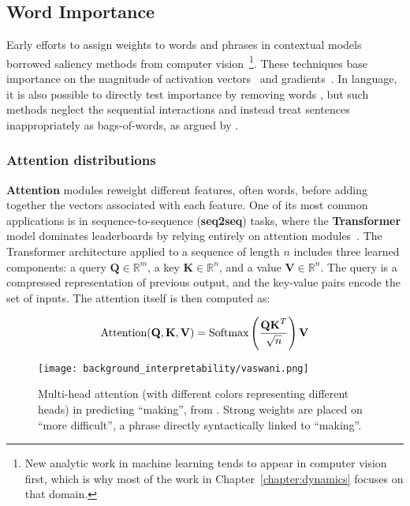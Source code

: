 \subsection{Word Importance} \label{sec:importance}

Early efforts to assign weights to words and phrases in contextual models borrowed saliency methods from computer vision~\citep{Simonyan2014DeepIC}\footnote{New analytic work in machine learning tends to appear in computer vision first, which is why most of the work in Chapter~\ref{chapter:dynamics} focuses on that domain.}. These  techniques base importance on the magnitude of activation vectors~\citep{karpathy_visualizing_2015} and gradients~\citep{li_visualizing_2015}. In language, it is also possible to directly test importance by removing words \citep{arras-etal-2016-explaining,li_understanding_2016}, but such methods neglect the sequential interactions and instead treat sentences inappropriately as bags-of-words, as argued by \citet{feng_pathologies_2018}.

\subsubsection{Attention distributions} \label{sec:attention_importance}

\textbf{Attention} modules reweight different features, often words, before adding together the vectors associated with each feature. One of its most common applications is in sequence-to-sequence (\textbf{seq2seq}) tasks, where the \textbf{Transformer} model dominates leaderboards by relying entirely on attention modules~\citep{vaswani_attention_2017}. The Transformer architecture applied to a sequence of length $n$ includes three learned components: a query $\textbf{Q} \in \mathbb{R}^m$, a key $\textbf{K} \in \mathbb{R}^n$, and a value $\textbf{V} \in \mathbb{R}^n$. The query is a compressed representation of previous output, and the key-value pairs encode the set of inputs. The attention itself is then computed as:

\begin{equation}
    \textrm{Attention}(\textbf{Q}, \textbf{K}, \textbf{V}) = \textnormal{Softmax} \left(\frac{\textbf{Q} \textbf{K}^T}{\sqrt{n}}\right) \textbf{V}
\end{equation}

\begin{figure}
    \centering
    \texttt{[image: background\_interpretability/vaswani.png]}
    \caption{Multi-head attention (with different colors representing different heads) in predicting ``making'', from \citet{vaswani_attention_2017}. Strong weights are placed on ``more difficult'', a phrase directly syntactically linked to ``making''.}
    \label{fig:attention_relevance}
\end{figure}


